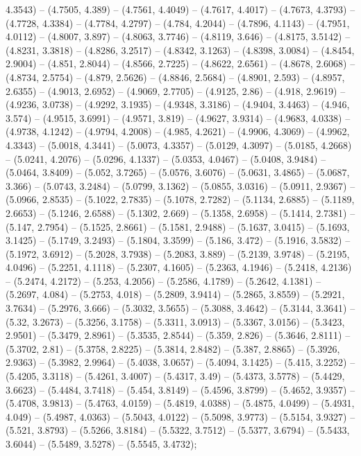 4.3543) -- (4.7505, 4.389) -- (4.7561, 4.4049) -- (4.7617, 4.4017) -- (4.7673, 4.3793) -- (4.7728, 4.3384) -- (4.7784, 4.2797) -- (4.784, 4.2044) -- (4.7896, 4.1143) -- (4.7951, 4.0112) -- (4.8007, 3.897) -- (4.8063, 3.7746) -- (4.8119, 3.646) -- (4.8175, 3.5142) -- (4.8231, 3.3818) -- (4.8286, 3.2517) -- (4.8342, 3.1263) -- (4.8398, 3.0084) -- (4.8454, 2.9004) -- (4.851, 2.8044) -- (4.8566, 2.7225) -- (4.8622, 2.6561) -- (4.8678, 2.6068) -- (4.8734, 2.5754) -- (4.879, 2.5626) -- (4.8846, 2.5684) -- (4.8901, 2.593) -- (4.8957, 2.6355) -- (4.9013, 2.6952) -- (4.9069, 2.7705) -- (4.9125, 2.86) -- (4.918, 2.9619) -- (4.9236, 3.0738) -- (4.9292, 3.1935) -- (4.9348, 3.3186) -- (4.9404, 3.4463) -- (4.946, 3.574) -- (4.9515, 3.6991) -- (4.9571, 3.819) -- (4.9627, 3.9314) -- (4.9683, 4.0338) -- (4.9738, 4.1242) -- (4.9794, 4.2008) -- (4.985, 4.2621) -- (4.9906, 4.3069) -- (4.9962, 4.3343) -- (5.0018, 4.3441) -- (5.0073, 4.3357) -- (5.0129, 4.3097) -- (5.0185, 4.2668) -- (5.0241, 4.2076) -- (5.0296, 4.1337) -- (5.0353, 4.0467) -- (5.0408, 3.9484) -- (5.0464, 3.8409) -- (5.052, 3.7265) -- (5.0576, 3.6076) -- (5.0631, 3.4865) -- (5.0687, 3.366) -- (5.0743, 3.2484) -- (5.0799, 3.1362) -- (5.0855, 3.0316) -- (5.0911, 2.9367) -- (5.0966, 2.8535) -- (5.1022, 2.7835) -- (5.1078, 2.7282) -- (5.1134, 2.6885) -- (5.1189, 2.6653) -- (5.1246, 2.6588) -- (5.1302, 2.669) -- (5.1358, 2.6958) -- (5.1414, 2.7381) -- (5.147, 2.7954) -- (5.1525, 2.8661) -- (5.1581, 2.9488) -- (5.1637, 3.0415) -- (5.1693, 3.1425) -- (5.1749, 3.2493) -- (5.1804, 3.3599) -- (5.186, 3.472) -- (5.1916, 3.5832) -- (5.1972, 3.6912) -- (5.2028, 3.7938) -- (5.2083, 3.889) -- (5.2139, 3.9748) -- (5.2195, 4.0496) -- (5.2251, 4.1118) -- (5.2307, 4.1605) -- (5.2363, 4.1946) -- (5.2418, 4.2136) -- (5.2474, 4.2172) -- (5.253, 4.2056) -- (5.2586, 4.1789) -- (5.2642, 4.1381) -- (5.2697, 4.084) -- (5.2753, 4.018) -- (5.2809, 3.9414) -- (5.2865, 3.8559) -- (5.2921, 3.7634) -- (5.2976, 3.666) -- (5.3032, 3.5655) -- (5.3088, 3.4642) -- (5.3144, 3.3641) -- (5.32, 3.2673) -- (5.3256, 3.1758) -- (5.3311, 3.0913) -- (5.3367, 3.0156) -- (5.3423, 2.9501) -- (5.3479, 2.8961) -- (5.3535, 2.8544) -- (5.359, 2.826) -- (5.3646, 2.8111) -- (5.3702, 2.81) -- (5.3758, 2.8225) -- (5.3814, 2.8482) -- (5.387, 2.8865) -- (5.3926, 2.9363) -- (5.3982, 2.9964) -- (5.4038, 3.0657) -- (5.4094, 3.1425) -- (5.415, 3.2252) -- (5.4205, 3.3118) -- (5.4261, 3.4007) -- (5.4317, 3.49) -- (5.4373, 3.5778) -- (5.4429, 3.6623) -- (5.4484, 3.7418) -- (5.454, 3.8149) -- (5.4596, 3.8799) -- (5.4652, 3.9357) -- (5.4708, 3.9813) -- (5.4763, 4.0159) -- (5.4819, 4.0388) -- (5.4875, 4.0499) -- (5.4931, 4.049) -- (5.4987, 4.0363) -- (5.5043, 4.0122) -- (5.5098, 3.9773) -- (5.5154, 3.9327) -- (5.521, 3.8793) -- (5.5266, 3.8184) -- (5.5322, 3.7512) -- (5.5377, 3.6794) -- (5.5433, 3.6044) -- (5.5489, 3.5278) -- (5.5545, 3.4732);



